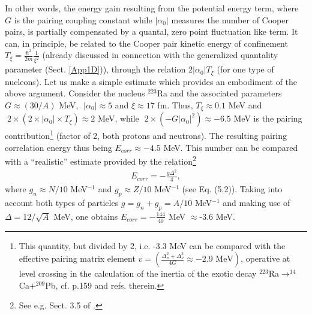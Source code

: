  
 
 
 In other words, the energy gain resulting from the potential energy term, where $G$ is the pairing coupling constant while $|\alpha_0|$ measures the number of Cooper pairs, is partially compensated by a quantal, zero point fluctuation like term. It can, in principle, be related to the Cooper pair kinetic energy of confinement $T_\xi=\frac{\hbar^2}{2m}\frac{1}{\xi^2}$ (already discussed in connection with the generalized quantality parameter (Sect. \ref{App1D})), through the relation $2|\alpha_0|T_\xi$ (for one type of nucleons). Let us make a simple estimate which  provides an embodiment  of the above argument. Consider the nucleus $^{223}$Ra and the associated parameters $G\approx(30/A)$ MeV,      $\;|\alpha_0|\approx 5$ and $\xi\approx 17$ fm. Thus,  $T_\xi\approx 0.1$ MeV and $\;2\times(2\times|\alpha_0|\times T_\xi)\approx2$ MeV, while $\;2\times (-G|\alpha_0|^2)\approx-6.5$ MeV is the pairing contribution\footnote{This quantity, but divided by 2, i.e. -3.3 MeV can be compared with the effective pairing matrix element $v=\left(\frac{\Delta_\pi^2+\Delta_\nu^2}{4G}\approx -2.9 \text{ MeV}\right)$, operative at level crossing in the calculation of the inertia of the exotic decay $^{223}$Ra$\rightarrow^{14}$Ca+$^{209}$Pb, cf. \cite{Brink:05} p.159 and refs. therein.} (factor of 2, both protons and neutrons). The resulting pairing correlation energy thus being $E_{corr}\approx-4.5$ MeV. This number can be compared with a ``realistic'' estimate provided by the relation\footnote{See e.g. Sect. 3.5 of \cite{Brink:05}.}
   \begin{align}\label{eq3B21}
E_{corr}=-\frac{g\Delta^2}{4},
   \end{align}  
 where $g_n\approx N/10$ MeV$^{-1}$ and $g_p\approx Z/10$ MeV$^{-1}$ (see \cite{Bortignon:98} Eq. (5.2)). Taking into account both types of particles $g=g_n+g_p=A/10$ MeV$^{-1}$ and making use of $\Delta=12/\sqrt{A}$ MeV, one obtains $E_{corr}=-\frac{144}{40}$ MeV $\approx$-3.6 MeV. 
 

